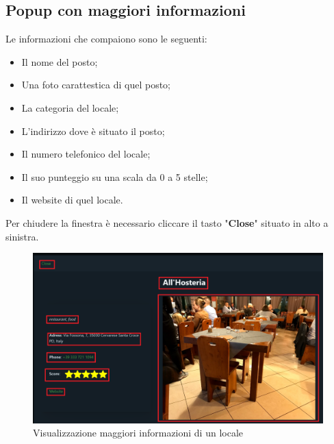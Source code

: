 {{    }

    \subsection{Popup con maggiori informazioni} {
        Le informazioni che compaiono sono le seguenti:
        \begin{itemize}
            \item Il nome del posto;
            \item Una foto carattestica di quel posto;
            \item La categoria del locale;
            \item L'indirizzo dove è situato il posto;
            \item Il numero telefonico del locale;
            \item Il suo punteggio su una scala da 0 a 5 stelle;
            \item Il website di quel locale.
        \end{itemize}

        Per chiudere la finestra è necessario cliccare il tasto "\textbf{Close}" situato in alto a sinistra.
        \begin{figure}[H]
            \includegraphics[width=12cm]{sezioni/images/popup.png}
            \centering
            \caption{Visualizzazione maggiori informazioni di un locale}
        \end{figure}
        }
}
